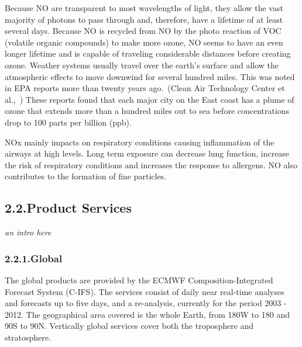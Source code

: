 \documentclass[9pt]{report}
\begin{document}
Because NO are transparent to most wavelengths of light, they allow the vast majority of photons to pass through and, therefore, have a lifetime of at least several days. 
Because NO is  recycled from NO by the photo reaction of VOC (volatile organic compounds) to make more ozone, NO seems to have an even longer lifetime and is capable of traveling considerable distances before creating ozone.  Weather systems usually travel over the earth’s surface and allow the atmospheric effects to move downwind for several hundred miles.
This was noted in EPA reports more than twenty years ago.~(Clean Air Technology Center et al.,~)
These reports found that each major city on the East coast has a plume of ozone that extends more than a hundred miles out to sea before concentrations drop to 100 parts per billion (ppb).%

NOx mainly impacts on respiratory conditions causing inflammation of the airways at high levels. Long term exposure can decrease lung function, increase the risk of respiratory conditions and increases the response to allergens. 
NO also contributes to the formation of fine particles.%

\subsection{2.2.\hspace*{0.5em}Product Services}\label{sec-product-services}%

\noindent{}\emph{an intro here}%

\subsubsection{2.2.1.\hspace*{0.5em}Global}\label{sec-global}%

\noindent{}The global products are provided by the ECMWF Composition-Integrated Forecast System (C-IFS).
The services consist of daily near real-time analyses and forecasts up to five days, and a re-analysis, currently for the period 2003 - 2012. 
The geographical area covered is the whole Earth, from 180\textdegree{}W to 180\textdegree{} and 90\textdegree{}S to 90\textdegree{}N. 
Vertically global services cover both the troposphere and stratosphere.%
\end{document}
